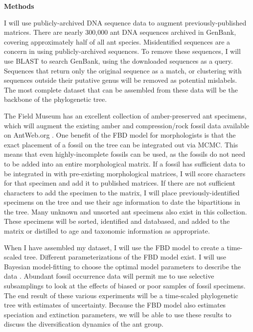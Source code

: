 \documentclass[]{article}
\begin{document}
\textbf{Methods} \par
I will use publicly-archived DNA sequence data to augment previously-published matrices. There are nearly 300,000 ant DNA sequences archived in GenBank, covering approximately half of all ant species. Misidentified sequences are a concern in using publicly-archived sequences. To remove these sequences, I will use BLAST \citep{altschul1990basic} to search GenBank, using the  downloaded sequences as a query. Sequences that return only the original sequence as a match, or clustering with sequences outside their putative genus will be removed as potential mislabels. The most complete dataset that can be assembled from these data will be the backbone of the phylogenetic tree.  \par
The Field Museum has an excellent collection of amber-preserved ant specimens, which will augment the existing amber and compression/rock fossil data available on AntWeb.org \citep{ ref87}. One benefit of the FBD model for morphologists is that the exact placement of a fossil on the tree can be integrated out via MCMC. This means that even highly-incomplete fossils can be used, as the fossils do not need to be added into an entire morphological matrix. If a fossil has sufficient data to be integrated in with pre-existing morphological matrices,  I will score characters for that specimen and add it to published matrices. If there are not sufficient characters to add the specimen to the matrix, I will place previously-identified specimens on the tree and use their age information to date the bipartitions in the tree. Many unknown and unsorted ant specimens also exist in this collection. These specimens will be sorted, identified and databased, and added to the matrix or distilled to age and taxonomic information as appropriate.  \par
When I have assembled my dataset, I will use the FBD model to create a time-scaled tree. Different parameterizations of the FBD model exist. I will use Bayesian model-fitting to choose the optimal model parameters to describe the data \citep{baele2012improving}. Abundant fossil occurrence data will permit me to use selective subsamplings to look at the effects of biased or poor samples of fossil specimens.  The end result of these various experiments will be a time-scaled phylogenetic tree with estimates of uncertainty. Because the FBD model also estimates speciation and extinction parameters, we will be able to use these results to discuss the diversification dynamics of the ant group. \par
\end{document}
